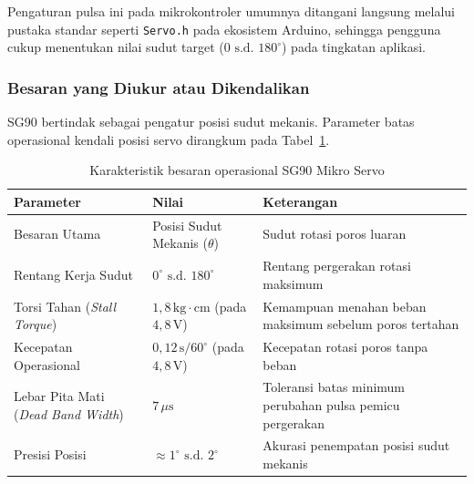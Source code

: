 Pengaturan pulsa ini pada mikrokontroler umumnya ditangani langsung melalui pustaka standar seperti \texttt{Servo.h} pada ekosistem Arduino, sehingga pengguna cukup menentukan nilai sudut target ($0\text{ s.d. }180^\circ$) pada tingkatan aplikasi.

\subsubsection{Besaran yang Diukur atau Dikendalikan}
SG90 bertindak sebagai pengatur posisi sudut mekanis. Parameter batas operasional kendali posisi servo dirangkum pada Tabel~\ref{tab:sg90_karakteristik_besaran}.

\begin{table}[H]
	\centering
	\caption{Karakteristik besaran operasional SG90 Mikro Servo}
	\label{tab:sg90_karakteristik_besaran}
	\small
	\begin{tabularx}{\textwidth}{@{} p{3.8cm} >{\hsize=0.7\hsize}X >{\hsize=1.3\hsize}X @{}}
		\toprule
		Parameter                                  & Nilai                                                     & Keterangan                                                \\
		\midrule
		Besaran Utama                              & Posisi Sudut Mekanis ($\theta$)                           & Sudut rotasi poros luaran                                 \\
		Rentang Kerja Sudut                        & $0^\circ \text{ s.d. } 180^\circ$                           & Rentang pergerakan rotasi maksimum                        \\
		Torsi Tahan (\textit{Stall Torque})        & $1{,}8\,\text{kg}\cdot\text{cm}$ (pada $4{,}8\,\text{V}$) & Kemampuan menahan beban maksimum sebelum poros tertahan   \\
		Kecepatan Operasional                      & $0{,}12\,\text{s}/60^\circ$ (pada $4{,}8\,\text{V}$)      & Kecepatan rotasi poros tanpa beban                        \\
		Lebar Pita Mati (\textit{Dead Band Width}) & $7\,\mu\text{s}$                                          & Toleransi batas minimum perubahan pulsa pemicu pergerakan \\
		Presisi Posisi                             & $\approx 1^\circ \text{ s.d. } 2^\circ$                     & Akurasi penempatan posisi sudut mekanis                   \\
		\bottomrule
	\end{tabularx}
\end{table}

